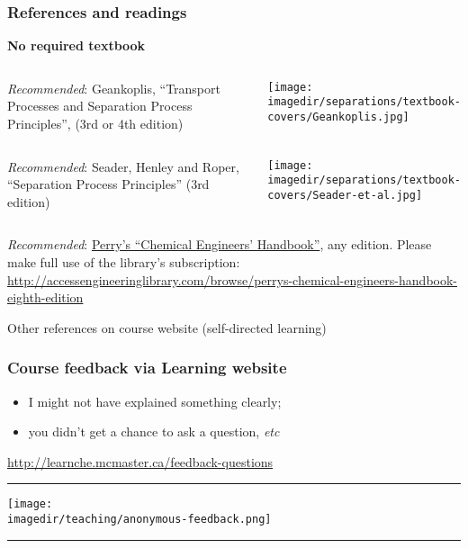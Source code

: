 \begin{frame}\frametitle{References and readings}
	
	\textbf{No required textbook}
	\begin{columns}[t]
			\emph{Recommended}: Geankoplis, ``Transport Processes and Separation Process Principles'', (3rd or 4th edition)
			\vspace{-1cm}
			\begin{center}
				\texttt{[image: \\imagedir/separations/textbook-covers/Geankoplis.jpg]}
			\end{center}
	\end{columns}
	
	\vspace{12pt}
	\begin{columns}[t]
			\emph{Recommended}: Seader, Henley and Roper, ``Separation Process Principles'' (3rd edition)
			\vspace{-1cm}
			\begin{center}
				\texttt{[image: \\imagedir/separations/textbook-covers/Seader-et-al.jpg]}
			\end{center}
	\end{columns}
	\vspace{12pt}	
	\emph{Recommended}: \href{http://accessengineeringlibrary.com/browse/perrys-chemical-engineers-handbook-eighth-edition}{Perry's ``Chemical Engineers' Handbook''}, any edition. Please make full use of the library's subscription: \\
	\href{http://accessengineeringlibrary.com/browse/perrys-chemical-engineers-handbook-eighth-edition}{\tiny http://accessengineeringlibrary.com/browse/perrys-chemical-engineers-handbook-eighth-edition}
	
	\vspace{24pt}
	Other references on course website (self-directed learning)
	
\end{frame}

\begin{frame}\frametitle{Course feedback via Learning website}
	\begin{itemize}
		\item	I might not have explained something clearly; 
		\item	you didn't get a chance to ask a question, \emph{etc}		
	\end{itemize}
	\href{http://learnche.mcmaster.ca/feedback-questions}{http://learnche.mcmaster.ca/feedback-questions}
	\vspace{12pt}
	\hrule
	\begin{center}
		\texttt{[image: \\imagedir/teaching/anonymous-feedback.png]}
	\end{center}
	\hrule
\end{frame}

